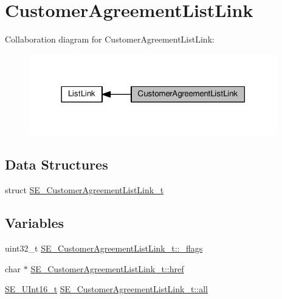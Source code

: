 \hypertarget{group__CustomerAgreementListLink}{}\section{Customer\+Agreement\+List\+Link}
\label{group__CustomerAgreementListLink}
Collaboration diagram for Customer\+Agreement\+List\+Link\+:\nopagebreak
\begin{figure}[H]
\begin{center}
\leavevmode
\includegraphics[width=306pt]{group__CustomerAgreementListLink}
\end{center}
\end{figure}
\subsection*{Data Structures}
\begin{DoxyCompactItemize}
\item 
struct \hyperlink{structSE__CustomerAgreementListLink__t}{S\+E\+\_\+\+Customer\+Agreement\+List\+Link\+\_\+t}
\end{DoxyCompactItemize}
\subsection*{Variables}
\begin{DoxyCompactItemize}
\item 
uint32\+\_\+t \hyperlink{group__CustomerAgreementListLink_ga617af80e74d41067f1798ec6ff0996d0}{S\+E\+\_\+\+Customer\+Agreement\+List\+Link\+\_\+t\+::\+\_\+flags}
\item 
char $\ast$ \hyperlink{group__CustomerAgreementListLink_gacc3612285c41b988cc39cd0bb29e7300}{S\+E\+\_\+\+Customer\+Agreement\+List\+Link\+\_\+t\+::href}
\item 
\hyperlink{group__UInt16_gac68d541f189538bfd30cfaa712d20d29}{S\+E\+\_\+\+U\+Int16\+\_\+t} \hyperlink{group__CustomerAgreementListLink_gad78e3e9fc208189a5e63162847120fc7}{S\+E\+\_\+\+Customer\+Agreement\+List\+Link\+\_\+t\+::all}
\end{DoxyCompactItemize}


